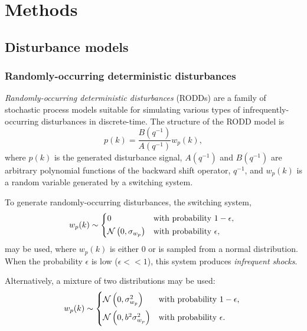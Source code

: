 \chapter{Methods}
\label{chap-methods}

\section{Disturbance models}

\subsection{Randomly-occurring deterministic disturbances}\label{subsec-RODD}

\textit{Randomly-occurring deterministic disturbances} (RODDs) \citep{macgregor_duality_1984} are a family of stochastic process models suitable for simulating various types of infrequently-occurring disturbances in discrete-time.  The structure of the RODD model is
\begin{equation} \label{eq:RODD}
	p(k)= \frac{B(q^{-1})}{A(q^{-1})}w_p(k),
\end{equation}
where $p(k)$ is the generated disturbance signal, $A(q^{-1})$ and $B(q^{-1})$ are arbitrary polynomial functions of the backward shift operator, $q^{-1}$, and $w_p(k)$ is a random variable generated by a switching system.

To generate randomly-occurring disturbances, the switching system,
\begin{equation} \label{eq:wpk1}
w_p(k) \sim 
\begin{cases*}
	0 & with probability $1-\epsilon$, \\
	\mathcal{N}\left(0, \sigma_{w_p}\right) & with probability $\epsilon$,
\end{cases*}
\end{equation}
may be used, where $w_p(k)$ is either 0 or is sampled from a normal distribution.  When the probability $\epsilon$ is low ($\epsilon<<1$), this system produces \textit{infrequent shocks}.

Alternatively, a mixture of two distributions may be used:
\begin{equation} \label{eq:wpk2}
w_p(k) \sim 
	\begin{cases*}
		\mathcal{N}\left(0, \sigma_{w_p}^2\right) & with probability $1-\epsilon$, \\
		\mathcal{N}\left(0, b^2\sigma_{w_p}^2\right) & with probability $\epsilon$.
	\end{cases*}
\end{equation}

